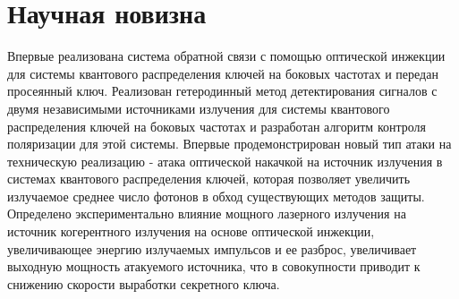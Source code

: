 \section*{Научная новизна}
Впервые реализована система обратной связи с помощью оптической инжекции для системы квантового распределения ключей на боковых частотах и передан просеянный ключ. Реализован гетеродинный метод детектирования сигналов с двумя независимыми источниками излучения для системы квантового распределения ключей на боковых частотах и разработан алгоритм контроля поляризации для этой системы. Впервые продемонстрирован новый тип атаки на техническую реализацию - атака оптической накачкой на источник излучения в системах квантового распределения ключей, которая позволяет увеличить излучаемое среднее число фотонов в обход существующих методов защиты. Определено экспериментально влияние мощного лазерного излучения на источник когерентного излучения на основе оптической инжекции, увеличивающее энергию излучаемых импульсов и ее разброс, увеличивает выходную мощность атакуемого источника, что в совокупности приводит к снижению скорости выработки секретного ключа.



